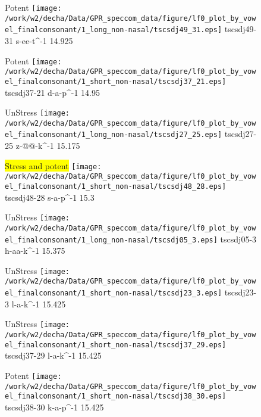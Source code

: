 \documentclass{article}
\begin{document}
\begin{figure}[t]
\begin{minipage}[b]{.24\textwidth}
\colorbox{Apricot}{Potent}
\centering
\texttt{[image: /work/w2/decha/Data/GPR\_speccom\_data/figure/lf0\_plot\_by\_vowel\_finalconsonant/1\_long\_non-nasal/tscsdj49\_31.eps]}
tscsdj49-31 s-ee-t\textasciicircum-1 14.925
\end{minipage}
\begin{minipage}[b]{.24\textwidth}
\colorbox{Apricot}{Potent}
\centering
\texttt{[image: /work/w2/decha/Data/GPR\_speccom\_data/figure/lf0\_plot\_by\_vowel\_finalconsonant/1\_short\_non-nasal/tscsdj37\_21.eps]}
tscsdj37-21 d-a-p\textasciicircum-1 14.95
\end{minipage}
\begin{minipage}[b]{.24\textwidth}
UnStress
\centering
\texttt{[image: /work/w2/decha/Data/GPR\_speccom\_data/figure/lf0\_plot\_by\_vowel\_finalconsonant/1\_long\_non-nasal/tscsdj27\_25.eps]}
tscsdj27-25 z-@@-k\textasciicircum-1 15.175
\end{minipage}
\begin{minipage}[b]{.24\textwidth}
\colorbox{yellow}{Stress and potent}
\centering
\texttt{[image: /work/w2/decha/Data/GPR\_speccom\_data/figure/lf0\_plot\_by\_vowel\_finalconsonant/1\_short\_non-nasal/tscsdj48\_28.eps]}
tscsdj48-28 s-a-p\textasciicircum-1 15.3
\end{minipage}
\end{figure}
\clearpage
\begin{figure}[t]
\begin{minipage}[b]{.24\textwidth}
UnStress
\centering
\texttt{[image: /work/w2/decha/Data/GPR\_speccom\_data/figure/lf0\_plot\_by\_vowel\_finalconsonant/1\_long\_non-nasal/tscsdj05\_3.eps]}
tscsdj05-3 h-aa-k\textasciicircum-1 15.375
\end{minipage}
\begin{minipage}[b]{.24\textwidth}
UnStress
\centering
\texttt{[image: /work/w2/decha/Data/GPR\_speccom\_data/figure/lf0\_plot\_by\_vowel\_finalconsonant/1\_short\_non-nasal/tscsdj23\_3.eps]}
tscsdj23-3 l-a-k\textasciicircum-1 15.425
\end{minipage}
\begin{minipage}[b]{.24\textwidth}
UnStress
\centering
\texttt{[image: /work/w2/decha/Data/GPR\_speccom\_data/figure/lf0\_plot\_by\_vowel\_finalconsonant/1\_short\_non-nasal/tscsdj37\_29.eps]}
tscsdj37-29 l-a-k\textasciicircum-1 15.425
\end{minipage}
\begin{minipage}[b]{.24\textwidth}
\colorbox{Apricot}{Potent}
\centering
\texttt{[image: /work/w2/decha/Data/GPR\_speccom\_data/figure/lf0\_plot\_by\_vowel\_finalconsonant/1\_short\_non-nasal/tscsdj38\_30.eps]}
tscsdj38-30 k-a-p\textasciicircum-1 15.425
\end{minipage}
\end{figure}
\end{document}
